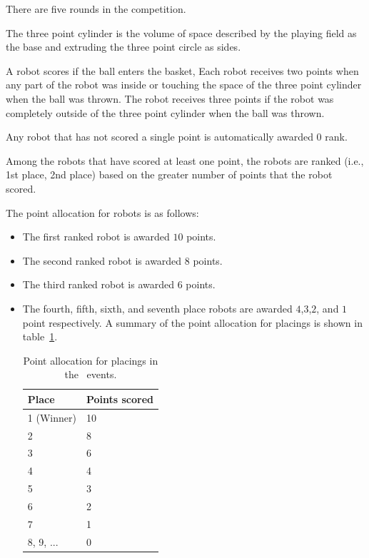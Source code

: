 \documentclass[12pt]{hurocup}
\begin{document}
\begin{lawlist}[BB]

\item There are five rounds in the competition.

\item The three point cylinder is the volume of space described by the
 playing field as the base and extruding the three point circle
 as sides. 

\item A robot scores if the ball enters the basket, Each robot
 receives two points when any part of the robot was inside or touching
 the space of the three point cylinder when the ball was thrown. The
 robot receives three points if the robot was completely outside of
 the three point cylinder when the ball was thrown.

\item Any robot that has not scored a single point is automatically
  awarded 0 rank.

\item Among the robots that have scored at least one point, the robots
  are ranked (i.e., 1st place, 2nd place) based on the greater number
  of points that the robot scored.

\item The point allocation for robots is as follows:
  \begin{itemize}
  \item The first ranked robot is awarded $10$ points.
  \item The second ranked robot is awarded $8$ points.
  \item The third ranked robot is awarded $6$ points.
  \item The fourth, fifth, sixth, and seventh place robots are awarded
    $4$,$3$,$2$, and $1$ point respectively.  A summary of the point
    allocation for placings is shown in table~\ref{point-allocation}.

    \begin{table}
      \begin{center}
        \begin{tabular}{l|l}
          \hline
          Place & Points scored \\
          \hline
          1 (Winner) & 10 \\
          2          & 8 \\
          3          & 6 \\
          4          & 4 \\
          5          & 3 \\
          6          & 2 \\
          7          & 1 \\
          8, 9, ...  & 0 \\
          \hline
        \end{tabular}
      \end{center}
      \caption{Point allocation for placings in the \HuroCup\ events.}
      \label{point-allocation}
    \end{table}
 \end{itemize}


\end{lawlist}
\end{document}
